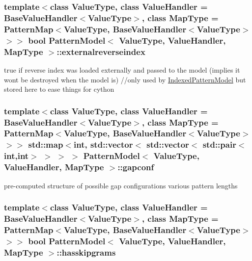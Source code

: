 \subsubsection[{externalreverseindex}]{\setlength{\rightskip}{0pt plus 5cm}template$<$class Value\+Type, class Value\+Handler = Base\+Value\+Handler$<$\+Value\+Type$>$, class Map\+Type = Pattern\+Map$<$\+Value\+Type, Base\+Value\+Handler$<$\+Value\+Type$>$$>$$>$ bool {\bf Pattern\+Model}$<$ Value\+Type, Value\+Handler, Map\+Type $>$\+::externalreverseindex}\label{classPatternModel_a2f1b4eec80a00ef9c6effea477cc98f4}


true if reverse index was loaded externally and passed to the model (implies it won\textquotesingle{}t be destroyed when the model is) //only used by \hyperlink{classIndexedPatternModel}{Indexed\+Pattern\+Model} but stored here to ease things for cython 

\hypertarget{classPatternModel_a1070e4e96457caf4ae35d23c1e9ac5c3}{}
\subsubsection[{gapconf}]{\setlength{\rightskip}{0pt plus 5cm}template$<$class Value\+Type, class Value\+Handler = Base\+Value\+Handler$<$\+Value\+Type$>$, class Map\+Type = Pattern\+Map$<$\+Value\+Type, Base\+Value\+Handler$<$\+Value\+Type$>$$>$$>$ std\+::map$<$int, std\+::vector$<$ std\+::vector$<$ std\+::pair$<$int,int$>$ $>$ $>$ $>$ {\bf Pattern\+Model}$<$ Value\+Type, Value\+Handler, Map\+Type $>$\+::gapconf\hspace{0.3cm}{\ttfamily [protected]}}\label{classPatternModel_a1070e4e96457caf4ae35d23c1e9ac5c3}


pre-\/computed structure of possible gap configurations various pattern lengths 

\hypertarget{classPatternModel_a9534e66035de7df26c9cd257e2faf7d1}{}
\subsubsection[{hasskipgrams}]{\setlength{\rightskip}{0pt plus 5cm}template$<$class Value\+Type, class Value\+Handler = Base\+Value\+Handler$<$\+Value\+Type$>$, class Map\+Type = Pattern\+Map$<$\+Value\+Type, Base\+Value\+Handler$<$\+Value\+Type$>$$>$$>$ bool {\bf Pattern\+Model}$<$ Value\+Type, Value\+Handler, Map\+Type $>$\+::hasskipgrams}\label{classPatternModel_a9534e66035de7df26c9cd257e2faf7d1}


